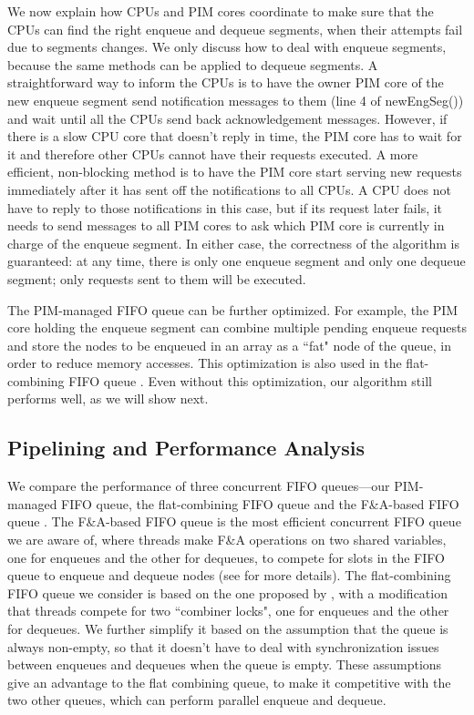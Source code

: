 We now explain how CPUs and PIM cores coordinate to make sure that the CPUs can find the right enqueue 
and dequeue segments, when their attempts fail due to segments changes. 
We only discuss how to deal with enqueue segments, 
because the same methods can be applied to dequeue segments. 
A straightforward way to inform the CPUs is to have the owner PIM core of the new enqueue segment 
send notification messages to them (line 4 of newEngSeg()) 
and wait until all the CPUs send back acknowledgement messages. 
However, if there is a slow CPU core that doesn't reply in time, 
the PIM core has to wait for it and therefore other CPUs cannot have their requests executed. 
A more efficient, non-blocking method is to have the PIM core start serving new requests 
immediately after it has sent off the notifications to all CPUs. 
A CPU does not have to reply to those notifications in this case, 
but if its request later fails, it needs to send messages to all PIM cores 
to ask which PIM core is currently in charge of the enqueue segment.
In either case, the correctness of the algorithm is guaranteed:  
at any time, there is only one enqueue segment and only one dequeue segment; 
only requests sent to them will be executed. 
  
The PIM-managed FIFO queue can be further optimized. 
For example, the PIM core holding the enqueue segment can combine multiple pending enqueue requests 
and store the nodes to be enqueued in an array as a ``fat" node of the queue, 
in order to reduce memory accesses. 
This optimization is also used in the flat-combining FIFO queue \cite{Hendler10}. 
Even without this optimization, our algorithm still performs well, as we will show next. 

\subsection{Pipelining and Performance Analysis}
We compare the performance of three concurrent FIFO queues---our PIM-managed FIFO queue, 
the flat-combining FIFO queue and the F\&A-based FIFO queue \cite{Morrison13}. 
The F\&A-based FIFO queue is the most efficient concurrent FIFO queue we are aware of, 
where threads make F\&A operations on two shared variables, 
one for enqueues and the other for dequeues, to compete for slots in the FIFO queue to 
enqueue and dequeue nodes (see \cite{Morrison13} for more details). 
The flat-combining FIFO queue we consider is based on the one proposed by \cite{Hendler10}, 
with a modification that threads compete for two ``combiner locks", 
one for enqueues and the other for dequeues. 
We further simplify it based on the assumption that the queue is always non-empty, 
so that it doesn't have to deal with synchronization issues between enqueues and dequeues 
when the queue is empty. These assumptions give an advantage to the flat combining queue, 
to make it competitive with the two other queues, which can perform parallel enqueue and dequeue. 


